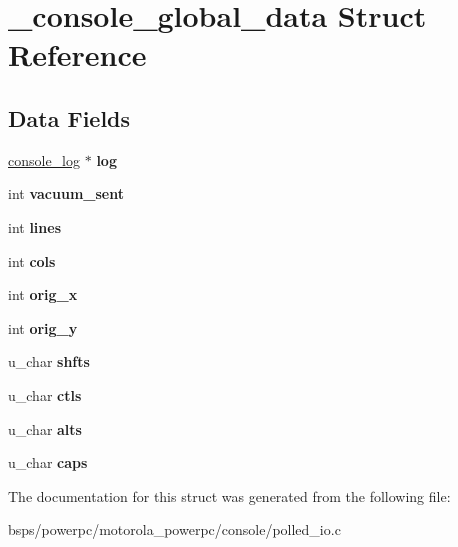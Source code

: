 \hypertarget{struct__console__global__data}{}\section{\+\_\+console\+\_\+global\+\_\+data Struct Reference}
\label{struct__console__global__data}
\subsection*{Data Fields}
\begin{DoxyCompactItemize}
\item 
\mbox{\label{struct__console__global__data_a6158e58e25c5581fe6002baa658cf231}} 
\mbox{\hyperlink{struct__console__log}{console\+\_\+log}} $\ast$ {\bfseries log}
\item 
\mbox{\label{struct__console__global__data_a8aeaa147360c2950de656c7b228bb87a}} 
int {\bfseries vacuum\+\_\+sent}
\item 
\mbox{\label{struct__console__global__data_ad41a157bfc2266d4195c73c104db19b9}} 
int {\bfseries lines}
\item 
\mbox{\label{struct__console__global__data_ae83589e363ff52245611fd43b2a82d86}} 
int {\bfseries cols}
\item 
\mbox{\label{struct__console__global__data_ae4812135461124400d6bc900909c4d55}} 
int {\bfseries orig\+\_\+x}
\item 
\mbox{\label{struct__console__global__data_a87fb42e6d8902a051c506cb6453323cc}} 
int {\bfseries orig\+\_\+y}
\item 
\mbox{\label{struct__console__global__data_a392f70f06b39811e3e3bf796cc9903d3}} 
u\+\_\+char {\bfseries shfts}
\item 
\mbox{\label{struct__console__global__data_ae5ff3b90051e1b6c9ed034866d3d16a1}} 
u\+\_\+char {\bfseries ctls}
\item 
\mbox{\label{struct__console__global__data_ad7ececd7592fbc998091c14d0a7aacc0}} 
u\+\_\+char {\bfseries alts}
\item 
\mbox{\label{struct__console__global__data_a19a0261da7a72c0c20c205909b9634fa}} 
u\+\_\+char {\bfseries caps}
\end{DoxyCompactItemize}


The documentation for this struct was generated from the following file\+:\begin{DoxyCompactItemize}
\item 
bsps/powerpc/motorola\+\_\+powerpc/console/polled\+\_\+io.\+c\end{DoxyCompactItemize}
